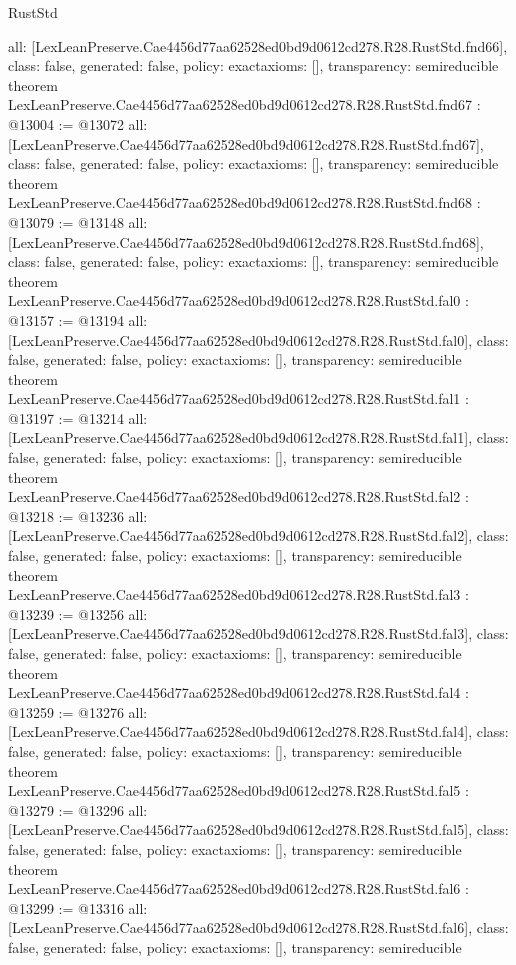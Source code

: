 \begin{lexlean}{RustStd}
\begin{coremodule}
{  all: [LexLeanPreserve.Cae4456d77aa62528ed0bd9d0612cd278.R28.RustStd.fnd66],
  class: false,
  generated: false,
  policy: exact{axioms: []},
  transparency: semireducible
}
theorem LexLeanPreserve.Cae4456d77aa62528ed0bd9d0612cd278.R28.RustStd.fnd67 : @13004 := @13072 {
  all: [LexLeanPreserve.Cae4456d77aa62528ed0bd9d0612cd278.R28.RustStd.fnd67],
  class: false,
  generated: false,
  policy: exact{axioms: []},
  transparency: semireducible
}
theorem LexLeanPreserve.Cae4456d77aa62528ed0bd9d0612cd278.R28.RustStd.fnd68 : @13079 := @13148 {
  all: [LexLeanPreserve.Cae4456d77aa62528ed0bd9d0612cd278.R28.RustStd.fnd68],
  class: false,
  generated: false,
  policy: exact{axioms: []},
  transparency: semireducible
}
theorem LexLeanPreserve.Cae4456d77aa62528ed0bd9d0612cd278.R28.RustStd.fal0 : @13157 := @13194 {
  all: [LexLeanPreserve.Cae4456d77aa62528ed0bd9d0612cd278.R28.RustStd.fal0],
  class: false,
  generated: false,
  policy: exact{axioms: []},
  transparency: semireducible
}
theorem LexLeanPreserve.Cae4456d77aa62528ed0bd9d0612cd278.R28.RustStd.fal1 : @13197 := @13214 {
  all: [LexLeanPreserve.Cae4456d77aa62528ed0bd9d0612cd278.R28.RustStd.fal1],
  class: false,
  generated: false,
  policy: exact{axioms: []},
  transparency: semireducible
}
theorem LexLeanPreserve.Cae4456d77aa62528ed0bd9d0612cd278.R28.RustStd.fal2 : @13218 := @13236 {
  all: [LexLeanPreserve.Cae4456d77aa62528ed0bd9d0612cd278.R28.RustStd.fal2],
  class: false,
  generated: false,
  policy: exact{axioms: []},
  transparency: semireducible
}
theorem LexLeanPreserve.Cae4456d77aa62528ed0bd9d0612cd278.R28.RustStd.fal3 : @13239 := @13256 {
  all: [LexLeanPreserve.Cae4456d77aa62528ed0bd9d0612cd278.R28.RustStd.fal3],
  class: false,
  generated: false,
  policy: exact{axioms: []},
  transparency: semireducible
}
theorem LexLeanPreserve.Cae4456d77aa62528ed0bd9d0612cd278.R28.RustStd.fal4 : @13259 := @13276 {
  all: [LexLeanPreserve.Cae4456d77aa62528ed0bd9d0612cd278.R28.RustStd.fal4],
  class: false,
  generated: false,
  policy: exact{axioms: []},
  transparency: semireducible
}
theorem LexLeanPreserve.Cae4456d77aa62528ed0bd9d0612cd278.R28.RustStd.fal5 : @13279 := @13296 {
  all: [LexLeanPreserve.Cae4456d77aa62528ed0bd9d0612cd278.R28.RustStd.fal5],
  class: false,
  generated: false,
  policy: exact{axioms: []},
  transparency: semireducible
}
theorem LexLeanPreserve.Cae4456d77aa62528ed0bd9d0612cd278.R28.RustStd.fal6 : @13299 := @13316 {
  all: [LexLeanPreserve.Cae4456d77aa62528ed0bd9d0612cd278.R28.RustStd.fal6],
  class: false,
  generated: false,
  policy: exact{axioms: []},
  transparency: semireducible
}
\end{coremodule}
\end{lexlean}
